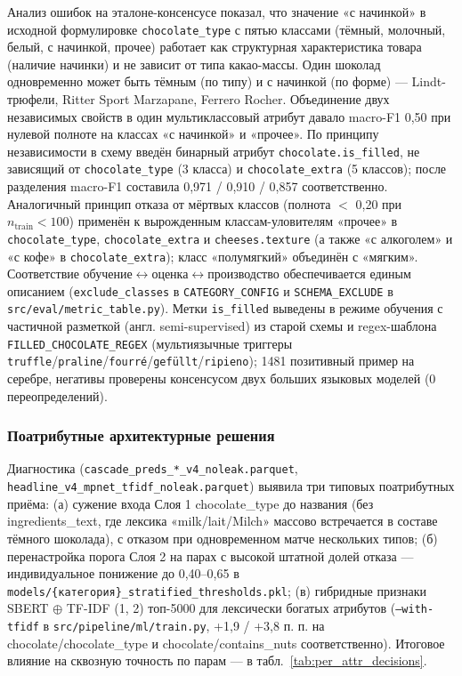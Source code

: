 Анализ ошибок на эталоне-консенсусе показал, что значение «с начинкой» в исходной формулировке \texttt{chocolate\_type} с пятью классами (тёмный, молочный, белый, с начинкой, прочее) работает как структурная характеристика товара (наличие начинки) и не зависит от типа какао-массы. Один шоколад одновременно может быть тёмным (по типу) и с начинкой (по форме) --- Lindt-трюфели, Ritter Sport Marzapane, Ferrero Rocher. Объединение двух независимых свойств в один мультиклассовый атрибут давало macro-F1 0,50 при нулевой полноте на классах «с начинкой» и «прочее». По принципу независимости в схему введён бинарный атрибут \texttt{chocolate.is\_filled}, не зависящий от \texttt{chocolate\_type} (3 класса) и \texttt{chocolate\_extra} (5 классов); после разделения macro-F1 составила 0,971 / 0,910 / 0,857 соответственно. Аналогичный принцип отказа от мёртвых классов (полнота $<$ 0,20 при $n_{\text{train}} < 100$) применён к вырожденным классам-уловителям «прочее» в \texttt{chocolate\_type}, \texttt{chocolate\_extra} и \texttt{cheeses.texture} (а также «с алкоголем» и «с кофе» в \texttt{chocolate\_extra}); класс «полумягкий» объединён с «мягким». Соответствие обучение$\leftrightarrow$оценка$\leftrightarrow$производство обеспечивается единым описанием (\texttt{exclude\_classes} в \texttt{CATEGORY\_CONFIG} и \texttt{SCHEMA\_EXCLUDE} в \texttt{src/eval/metric\_table.py}). Метки \texttt{is\_filled} выведены в режиме обучения с частичной разметкой (англ. semi-supervised) из старой схемы и regex-шаблона \texttt{FILLED\_CHOCOLATE\_REGEX} (мультиязычные триггеры \texttt{truffle}/\texttt{praline}/\texttt{fourré}/\texttt{gefüllt}/\texttt{ripieno}); 1481 позитивный пример на серебре, негативы проверены консенсусом двух больших языковых моделей (0 переопределений).

\subsubsection{Поатрибутные архитектурные решения}

Диагностика (\texttt{cascade\_preds\_*\_v4\_noleak.parquet}, \texttt{headline\_v4\_mpnet\_tfidf\_noleak.parquet}) выявила три типовых поатрибутных приёма: (а) сужение входа Слоя 1 chocolate\_type до названия (без ingredients\_text, где лексика «milk/lait/Milch» массово встречается в составе тёмного шоколада), с отказом при одновременном матче нескольких типов; (б) перенастройка порога Слоя 2 на парах с высокой штатной долей отказа --- индивидуальное понижение до 0,40--0,65 в \texttt{models/\{категория\}\_stratified\_thresholds.pkl}; (в) гибридные признаки SBERT $\oplus$ TF-IDF (1, 2) топ-5000 для лексически богатых атрибутов (\texttt{--with-tfidf} в \texttt{src/pipeline/ml/train.py}, +1,9 / +3,8 п. п. на chocolate/chocolate\_type и chocolate/contains\_nuts соответственно). Итоговое влияние на сквозную точность по парам --- в табл.~\ref{tab:per_attr_decisions}.

